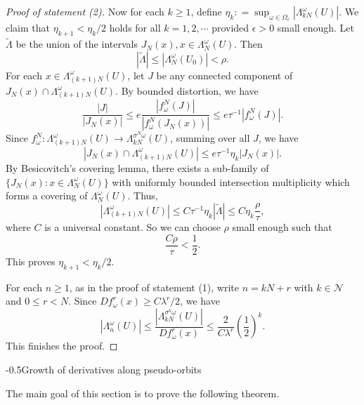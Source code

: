 \documentclass[11pt,oneside]{article}
\makeatletter
\theoremstyle{plain}
\numberwithin{equation}{section}
\numberwithin{figure}{section}
\numberwithin{table}{section}
\renewcommand{\section}{\@startsection{section}{1}{0mm}
{-\baselineskip}{0.5\baselineskip}{\Large\bf\leftline}}
\makeatother
\begin{document}
\begin{proof}[Proof of statement (2)]
Now for each $k \geq 1$, define $\eta_k : = \sup_{\omega \in \Omega_{\epsilon}} |\Lambda_{kN}^{\omega}(U)|$. We claim that $\eta_{k+1} < \eta_k/2$ holds for all $k =1, 2, \cdots$ provided $\epsilon>0$ small enough. Let $\tilde \Lambda$ be the union of the intervals $J_N(x), x \in \Lambda_{N}^{\omega}(U)$. Then 
\[
|\tilde \Lambda| \leq |\Lambda_{N}^{\omega}(U_0)| < \rho.
\]
For each $x \in \Lambda_{(k+1)N}^{\omega} (U)$, let $J$ be any connected component of $J_N(x) \cap \Lambda_{(k+1)N}^{\omega} (U)$. By bounded distortion, we have
\[
\frac{|J|}{|J_N(x)|} \leq e \frac{|f_{\omega}^N(J)|}{|f_{\omega}^N (J_N(x)) | } \leq e \tau^{-1} |f_{\omega}^N(J)|.
\]
Since $f_{\omega}^N: \Lambda_{(k+1)N}^{\omega} (U) \to  \Lambda_{kN}^{\sigma^N \omega } (U) $, summing over all $J$, we have
\[
| J_N(x) \cap \Lambda_{(k+1)N}^{\omega} (U)| \leq e\tau^{-1} \eta_k |J_N(x)|.
\]
By Besicovitch's covering lemma, there exists a sub-family of $\{ J_N(x) : x \in \Lambda_{N}^{\omega}(U) \}$ with uniformly bounded intersection multiplicity which forms a covering of $\Lambda_{N}^{\omega}(U) $. Thus,
\[
| \Lambda_{(k+1)N}^{\omega} (U) | \leq C \tau^{-1} \eta_k |\tilde \Lambda| \leq C \eta_k \frac{\rho}{\tau},
\]
where $C$ is a universal constant. So we can choose $\rho$ small enough such that
\[
 \frac{ C \rho}{\tau} < \frac{1}{2}.
\]
This proves $\eta_{k+1} < \eta_k/2$.


For each $n \geq 1$, as in the proof of statement (1), write $n = kN +r$ with $k \in \mathcal N$ and $0 \leq r < N$. Since $Df_{\omega}^r (x) \geq C \lambda^r/2$, we have
\[
| \Lambda_{n}^{\omega} (U) | \leq \frac{ | \Lambda_{kN}^{\sigma^k \omega} (U)|}{Df_{\omega}^r (x)} \leq \frac{2}{C \lambda^r} \left(\frac{1}{2} \right)^k.
\]
This finishes the proof.

\end{proof}



\section{Growth of derivatives along pseudo-orbits}


The main goal of this section is to prove the following theorem. 
\end{document}
